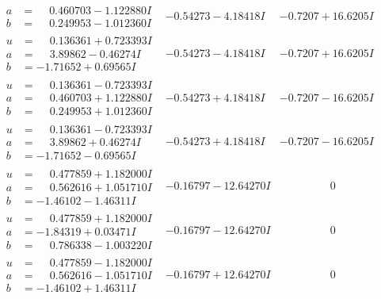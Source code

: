 \documentclass[1p]{elsarticle_modified}
\theoremstyle{definition}
\begin{document}
$$\begin{array}{c|c|c}
\begin{aligned}
a &= \phantom{-}0.460703 - 1.122880 I \\
b &= \phantom{-}0.249953 - 1.012360 I\end{aligned}
 & -0.54273 - 4.18418 I & -0.7207 + 16.6205 I \\ \hline\begin{aligned}
u &= \phantom{-}0.136361 + 0.723393 I \\
a &= \phantom{-}3.89862 - 0.46274 I \\
b &= -1.71652 + 0.69565 I\end{aligned}
 & -0.54273 - 4.18418 I & -0.7207 + 16.6205 I \\ \hline\begin{aligned}
u &= \phantom{-}0.136361 - 0.723393 I \\
a &= \phantom{-}0.460703 + 1.122880 I \\
b &= \phantom{-}0.249953 + 1.012360 I\end{aligned}
 & -0.54273 + 4.18418 I & -0.7207 - 16.6205 I \\ \hline\begin{aligned}
u &= \phantom{-}0.136361 - 0.723393 I \\
a &= \phantom{-}3.89862 + 0.46274 I \\
b &= -1.71652 - 0.69565 I\end{aligned}
 & -0.54273 + 4.18418 I & -0.7207 - 16.6205 I \\ \hline\begin{aligned}
u &= \phantom{-}0.477859 + 1.182000 I \\
a &= \phantom{-}0.562616 + 1.051710 I \\
b &= -1.46102 - 1.46311 I\end{aligned}
 & -0.16797 - 12.64270 I & \phantom{-0.000000 } 0 \\ \hline\begin{aligned}
u &= \phantom{-}0.477859 + 1.182000 I \\
a &= -1.84319 + 0.03471 I \\
b &= \phantom{-}0.786338 - 1.003220 I\end{aligned}
 & -0.16797 - 12.64270 I & \phantom{-0.000000 } 0 \\ \hline\begin{aligned}
u &= \phantom{-}0.477859 - 1.182000 I \\
a &= \phantom{-}0.562616 - 1.051710 I \\
b &= -1.46102 + 1.46311 I\end{aligned}
 & -0.16797 + 12.64270 I & \phantom{-0.000000 } 0 \\ \hline\begin{aligned}

\end{aligned}
\end{array}$$
\end{document}
